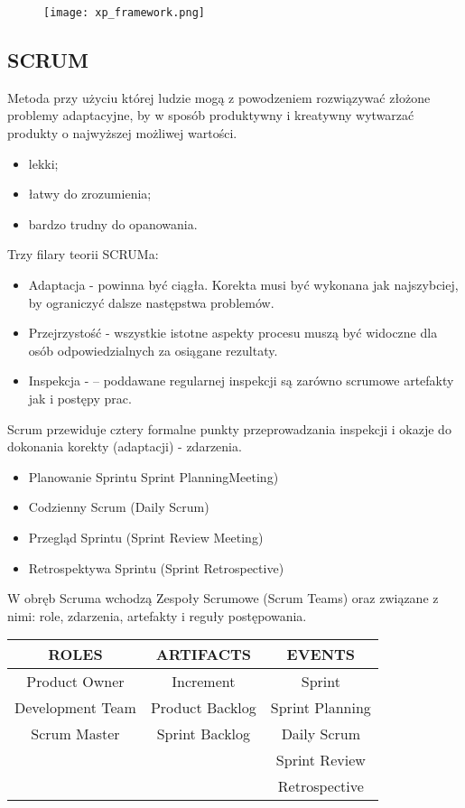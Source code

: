 \documentclass[a4paper]{article}
\begin{document}
\begin{figure}
    \texttt{[image: xp\_framework.png]}
\end{figure}

\subsection{SCRUM}
Metoda przy użyciu której ludzie mogą z powodzeniem rozwiązywać złożone problemy
adaptacyjne, by w sposób produktywny i kreatywny wytwarzać produkty o najwyższej możliwej wartości.
\begin{itemize}
    \item lekki;
    \item łatwy do zrozumienia;
    \item bardzo trudny do opanowania.
\end{itemize}

Trzy filary teorii SCRUMa:
\begin{itemize}
    \item Adaptacja - powinna być ciągła. Korekta musi być
wykonana jak najszybciej, by ograniczyć dalsze
następstwa problemów.
    \item Przejrzystość - wszystkie istotne aspekty procesu
muszą być widoczne dla osób odpowiedzialnych
za osiągane rezultaty.
    \item Inspekcja - – poddawane regularnej inspekcji są
zarówno scrumowe artefakty jak i postępy prac.
\end{itemize}



Scrum przewiduje cztery formalne punkty
przeprowadzania inspekcji i okazje do dokonania
korekty (adaptacji) - zdarzenia.
\begin{itemize}
    \item Planowanie Sprintu Sprint PlanningMeeting)
    \item Codzienny Scrum (Daily Scrum)
    \item Przegląd Sprintu (Sprint Review Meeting)
    \item Retrospektywa Sprintu (Sprint Retrospective)
\end{itemize}

W obręb Scruma wchodzą Zespoły Scrumowe
(Scrum Teams) oraz związane z nimi: role,
zdarzenia, artefakty i reguły postępowania.

\begin{tabular}{|c|c|c|}
\hline
ROLES & ARTIFACTS & EVENTS\\
\hline
Product Owner & Increment & Sprint\\
Development Team & Product Backlog & Sprint Planning\\
Scrum Master & Sprint Backlog & Daily Scrum\\
& & Sprint Review\\
& & Retrospective\\
\hline
\end{tabular}
\end{document}
